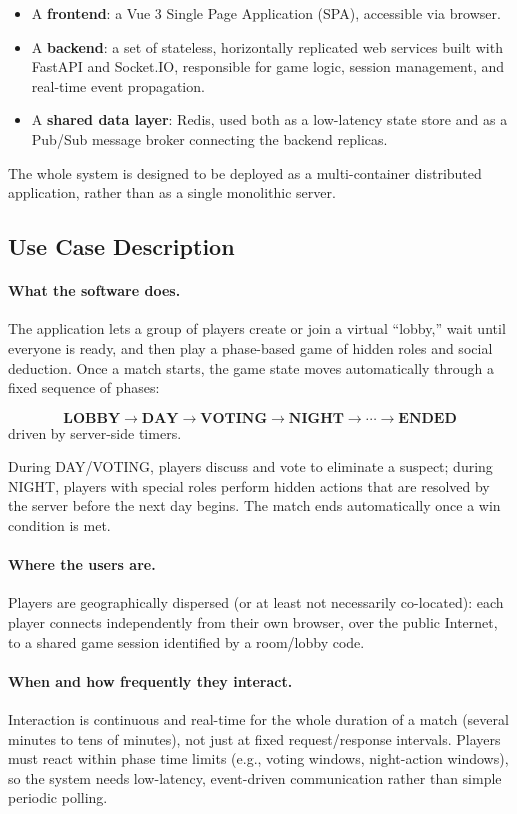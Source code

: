 \documentclass{scrartcl}
\begin{document}
\begin{itemize}
    \item A \textbf{frontend}: a Vue 3 Single Page Application (SPA), accessible via browser.
    \item A \textbf{backend}: a set of stateless, horizontally replicated web services built with FastAPI and Socket.IO, responsible for game logic, session management, and real-time event propagation.
    \item A \textbf{shared data layer}: Redis, used both as a low-latency state store and as a Pub/Sub message broker connecting the backend replicas.
\end{itemize}

The whole system is designed to be deployed as a multi-container distributed application, rather than as a single monolithic server.

\subsection{Use Case Description}

\paragraph{What the software does.}
The application lets a group of players create or join a virtual ``lobby,'' wait until everyone is ready, and then play a phase-based game of hidden roles and social deduction. Once a match starts, the game state moves automatically through a fixed sequence of phases:

\[
\textbf{LOBBY} \rightarrow \textbf{DAY} \rightarrow \textbf{VOTING} \rightarrow \textbf{NIGHT} \rightarrow \cdots \rightarrow \textbf{ENDED}
\]
driven by server-side timers.

During DAY/VOTING, players discuss and vote to eliminate a suspect; during NIGHT, players with special roles perform hidden actions that are resolved by the server before the next day begins. The match ends automatically once a win condition is met.

\paragraph{Where the users are.}
Players are geographically dispersed (or at least not necessarily co-located): each player connects independently from their own browser, over the public Internet, to a shared game session identified by a room/lobby code.

\paragraph{When and how frequently they interact.}
Interaction is continuous and real-time for the whole duration of a match (several minutes to tens of minutes), not just at fixed request/response intervals. Players must react within phase time limits (e.g., voting windows, night-action windows), so the system needs low-latency, event-driven communication rather than simple periodic polling.
\end{document}

